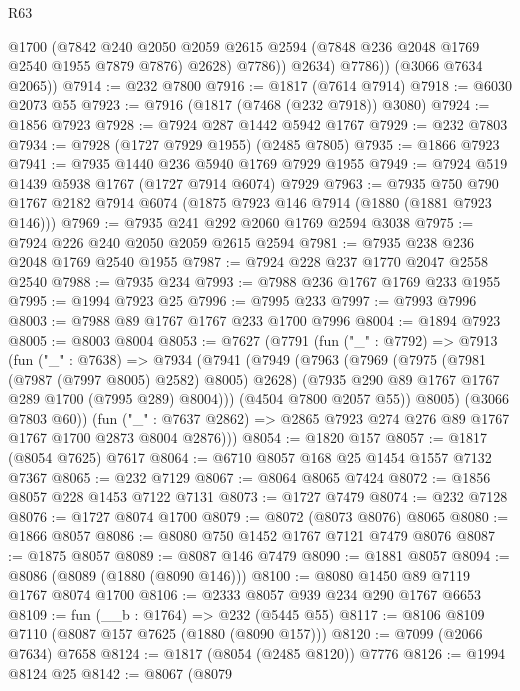 \begin{lexlean}{R63}
\begin{coremodule}
                @1700
                (@7842
                  @240
                  @2050
                  @2059
                  @2615
                  @2594
                  (@7848 @236 @2048 @1769 @2540 @1955 @7879 @7876)
                  @2628)
                @7786))
            @2634)
          @7786))
      (@3066 @7634 @2065))
@7914 := @232 @7800
@7916 := @1817 (@7614 @7914)
@7918 := @6030 @2073 @55
@7923 := @7916 (@1817 (@7468 (@232 @7918)) @3080)
@7924 := @1856 @7923
@7928 := @7924 @287 @1442 @5942 @1767
@7929 := @232 @7803
@7934 := @7928 (@1727 @7929 @1955) (@2485 @7805)
@7935 := @1866 @7923
@7941 := @7935 @1440 @236 @5940 @1769 @7929 @1955
@7949 := @7924 @519 @1439 @5938 @1767 (@1727 @7914 @6074) @7929
@7963 := @7935 @750 @790 @1767 @2182 @7914 @6074 (@1875 @7923 @146 @7914 (@1880 (@1881 @7923 @146)))
@7969 := @7935 @241 @292 @2060 @1769 @2594 @3038
@7975 := @7924 @226 @240 @2050 @2059 @2615 @2594
@7981 := @7935 @238 @236 @2048 @1769 @2540 @1955
@7987 := @7924 @228 @237 @1770 @2047 @2558 @2540
@7988 := @7935 @234
@7993 := @7988 @236 @1767 @1769 @233 @1955
@7995 := @1994 @7923 @25
@7996 := @7995 @233
@7997 := @7993 @7996
@8003 := @7988 @89 @1767 @1767 @233 @1700 @7996
@8004 := @1894 @7923
@8005 := @8003 @8004
@8053 := @7627
    (@7791
      (fun ("_" : @7792) =>
      @7913
        (fun ("_" : @7638) =>
        @7934
          (@7941
            (@7949
              (@7963
                (@7969
                  (@7975 (@7981 (@7987 (@7997 @8005) @2582) @8005) @2628)
                  (@7935 @290 @89 @1767 @1767 @289 @1700 (@7995 @289) @8004)))
              (@4504 @7800 @2057 @55))
            @8005)
          (@3066 @7803 @60))
        (fun ("_" : @7637 @2862) => @2865 @7923 @274 @276 @89 @1767 @1767 @1700 @2873 @8004 @2876)))
@8054 := @1820 @157
@8057 := @1817 (@8054 @7625) @7617
@8064 := @6710 @8057 @168 @25 @1454 @1557 @7132 @7367
@8065 := @232 @7129
@8067 := @8064 @8065 @7424
@8072 := @1856 @8057 @228 @1453 @7122 @7131
@8073 := @1727 @7479
@8074 := @232 @7128
@8076 := @1727 @8074 @1700
@8079 := @8072 (@8073 @8076) @8065
@8080 := @1866 @8057
@8086 := @8080 @750 @1452 @1767 @7121 @7479 @8076
@8087 := @1875 @8057
@8089 := @8087 @146 @7479
@8090 := @1881 @8057
@8094 := @8086 (@8089 (@1880 (@8090 @146)))
@8100 := @8080 @1450 @89 @7119 @1767 @8074 @1700
@8106 := @2333 @8057 @939 @234 @290 @1767 @6653
@8109 := fun (__b : @1764) => @232 (@5445 @55)
@8117 := @8106 @8109 @7110 (@8087 @157 @7625 (@1880 (@8090 @157)))
@8120 := @7099 (@2066 @7634) @7658
@8124 := @1817 (@8054 (@2485 @8120)) @7776
@8126 := @1994 @8124 @25
@8142 := @8067
    (@8079

\end{coremodule}
\end{lexlean}

